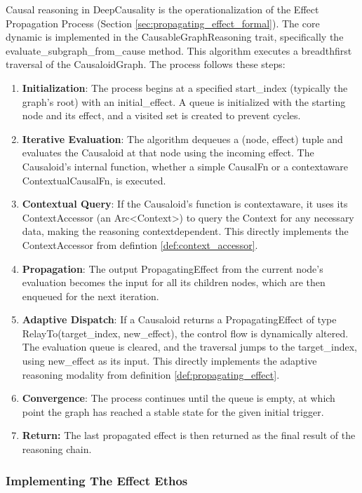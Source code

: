 Causal reasoning in DeepCausality is the operationalization of the Effect Propagation Process (Section \ref{sec:propagating_effect_formal}). The core dynamic is implemented in the CausableGraphReasoning trait, specifically the evaluate\_subgraph\_from\_cause method. This algorithm executes a breadth\-first traversal of the CausaloidGraph.
The process follows these steps:
\begin{enumerate}
    \item \textbf{Initialization}: The process begins at a specified start\_index (typically the graph's root) with an initial\_effect. A queue is initialized with the starting node and its effect, and a visited set is created to prevent cycles.
    \item \textbf{Iterative Evaluation}: The algorithm dequeues a (node, effect) tuple and evaluates the Causaloid at that node using the incoming effect. The Causaloid's internal function, whether a simple CausalFn or a context\-aware ContextualCausalFn, is executed.
    \item \textbf{Contextual Query}: If the Causaloid's function is context\-aware, it uses its ContextAccessor (an Arc<Context>) to query the Context for any necessary data, making the reasoning context\-dependent. This directly implements the ContextAccessor from defintion \ref{def:context_accessor}.
    \item \textbf{Propagation}: The output PropagatingEffect from the current node's evaluation becomes the input for all its children nodes, which are then enqueued for the next iteration.
    \item \textbf{Adaptive Dispatch}: If a Causaloid returns a PropagatingEffect of type RelayTo(target\_index, new\_effect), the control flow is dynamically altered. The evaluation queue is cleared, and the traversal jumps to the target\_index, using new\_effect as its input. This directly implements the adaptive reasoning modality from definition \ref{def:propagating_effect}.
    \item \textbf{Convergence}: The process continues until the queue is empty, at which point the graph has reached a stable state for the given initial trigger. 
    \item \textbf{Return:} The last propagated effect is then returned as the final result of the reasoning chain.
\end{enumerate}

\subsubsection{Implementing The Effect Ethos}

